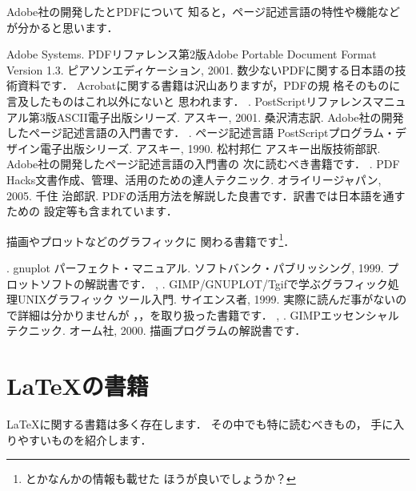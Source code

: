 Adobe社の開発した{\PS}とPDFについて
知ると，ページ記述言語の特性や機能など
が分かると思います．
%
\begin{myreferences}
  Adobe Systems. \newblock
  PDFリファレンス第2版\zdash Adobe Portable Document Format Version 1.3.
  ピアソンエディケーション, 2001.
  \sanko
  数少ないPDFに関する日本語の技術資料です．
  Acrobatに関する書籍は沢山ありますが，PDFの規
  格そのものに言及したものはこれ以外にないと
  思われます．
%
\iiiemdash. \newblock
PostScriptリファレンスマニュアル第3版\zdash ASCII電子出版シリーズ.
アスキー, 2001.
桑沢清志訳.
\sanko
Adobe社の開発したページ記述言語{\PS}の入門書です．
%
\iiiemdash. \newblock
ページ記述言語 PostScriptプログラム・デザイン\zdash 電子出版シリーズ.
アスキー, 1990.
松村邦仁 アスキー出版技術部訳.
\sanko
Adobe社の開発したページ記述言語{\PS}の入門書の
次に読むべき書籍です．
%
  . \newblock
  PDF Hacks\zdash 文書作成、管理、活用のための達人テクニック. 
  オライリージャパン, 2005. 
  千住 治郎訳. 
  \sanko PDFの活用方法を解説した良書です．訳書では日本語を通すための
  設定等も含まれています．
\end{myreferences}
%
描画やプロットなどのグラフィックに
関わる書籍です\footnote{
とかなんかの情報も載せた
ほうが良いでしょうか？}．
\begin{myreferences}
. \newblock
gnuplot パーフェクト・マニュアル.
ソフトバンク・パブリッシング, 1999.
\sanko
プロットソフトの解説書です．
%
, . \newblock
GIMP/GNUPLOT/Tgifで学ぶグラフィック処理\zdash UNIXグラフィック
ツール入門\zdash.
サイエンス者, 1999.
\sanko
実際に読んだ事がないので詳細は分かりませんが
，，を取り扱った書籍です．
%
, . \newblock
GIMPエッセンシャルテクニック.
オーム社, 2000.
\sanko
描画プログラムの解説書です．
\end{myreferences}
%


\section{{\protect\LaTeX}の書籍}
{\LaTeX}に関する書籍は多く存在します．
その中でも特に読むべきもの，
手に入りやすいものを紹介します．

